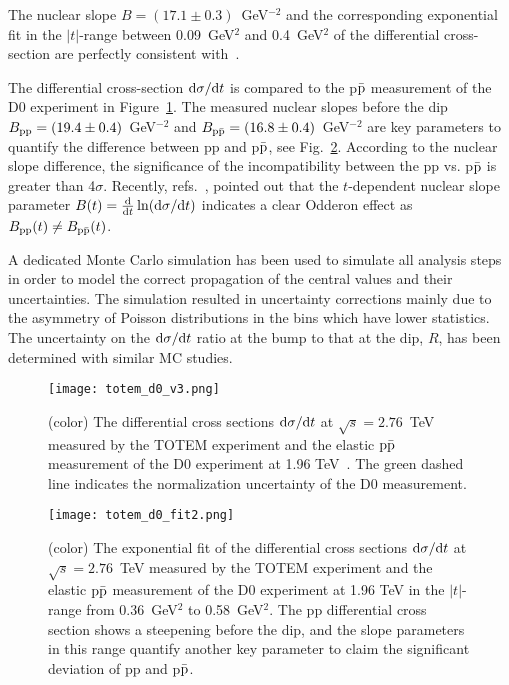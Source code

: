 \documentclass[TOTEM]{cernphprep}
\begin{document}
	The nuclear slope $B=(17.1\pm0.3)$~GeV$^{-2}$ and the corresponding exponential fit in the $|t|$-range between 0.09~GeV$^{2}$ and 0.4~GeV$^{2}$ of the differential cross-section are perfectly consistent with~\cite{Paper_2p76,Antchev:2017dia}.
	
	The differential cross-section ${\rm d}\sigma/{\rm d}t$ is compared to the p$\bar{\rm p}$ measurement of the D0 experiment in Figure~\ref{differential_cross_section_with_D0}.
 	The measured nuclear slopes before the dip $B_{\rm pp}=(19.4\pm0.4)$~GeV$^{-2}$ and $B_{\rm p\bar{p}}=(16.8\pm0.4)$~GeV$^{-2}$ are key parameters to quantify the difference between pp and p$\bar{\rm p}$, see Fig.~\ref{differential_cross_section_with_D0_fits}. According to
	the nuclear slope difference, the significance of the incompatibility between the pp vs. p$\rm\bar{p}$ is greater than 4$\sigma$. Recently, refs.~\cite{Martynov:2018sga,Csorgo:2018uyp}, pointed out
	that the $t$-dependent nuclear slope parameter $B(t)=\frac{\rm d}{{\rm d}t}\ln({\rm d}\sigma/{\rm d}t)$ indicates a clear Odderon effect as $B_{\rm pp}(t) \ne B_{\rm p\bar{p}}(t)$.

	A dedicated Monte Carlo simulation has been used to simulate all analysis steps in order to model the correct propagation of the central values and their uncertainties.
	The simulation resulted in uncertainty corrections mainly due to the asymmetry of Poisson distributions	in the bins which have lower statistics. The uncertainty on the
	${\rm d}\sigma/{\rm d}t$ ratio at the bump to that at the dip, $R$, has been determined with similar MC studies.

	\begin{figure*}[h]
		\texttt{[image: totem\_d0\_v3.png]}
		\caption{(color) The differential cross sections ${\rm d}\sigma/{\rm d}t$ at $\sqrt{s}=2.76$~TeV measured by the TOTEM experiment and the elastic $\rm p\bar{p}$ measurement of the D0 experiment at 1.96 TeV~\cite{Abazov:2012qb}. The
		green dashed line indicates the normalization uncertainty of the D0 measurement.}
		\label{differential_cross_section_with_D0}
	\end{figure*}

	\begin{figure*}[h]
		\texttt{[image: totem\_d0\_fit2.png]}
		\caption{(color) The exponential fit of the differential cross sections ${\rm d}\sigma/{\rm d}t$ at $\sqrt{s}=2.76$~TeV measured by the TOTEM experiment and the elastic $\rm p\bar{p}$ measurement
		of the D0 experiment at 1.96 TeV in the $|t|$-range from 0.36~GeV$^{2}$ to 0.58~GeV$^{2}$. The pp differential cross section shows a steepening before the dip, and the slope parameters
		in this range quantify another key parameter to claim the significant deviation of pp and p$\rm \bar{p}$.}
		\label{differential_cross_section_with_D0_fits}
	\end{figure*}
\end{document}
